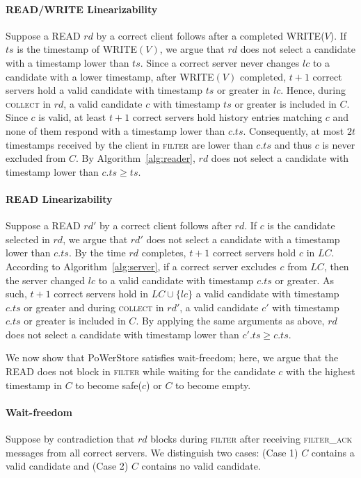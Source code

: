 \documentclass[10pt,conference,compsocconf]{IEEEtran}
\newcommand{\protocol}{PoWerStore}
\begin{document}
\paragraph{\textsc{READ}/\textsc{WRITE} Linearizability}
Suppose a \textsc{READ} $rd$ by a correct client follows after a completed \textsc{WRITE}($V$). If $ts$ is the timestamp of \textsc{WRITE}$(V)$, we argue that $rd$ does not select a candidate with a timestamp lower than $ts$. Since a correct server never changes $lc$ to a candidate with a lower timestamp, after \textsc{WRITE}$(V)$ completed, $t+1$ correct servers hold a valid candidate with timestamp $ts$ or greater in $lc$. Hence, during \textsc{collect} in $rd$, a valid candidate $c$ with timestamp $ts$ or greater is included in $C$. Since $c$ is valid, at least $t+1$ correct servers hold history entries matching $c$ and none of them respond with a timestamp lower than $c.ts$. Consequently, at most $2t$ timestamps received by the client in \textsc{filter} are lower than $c.ts$ and thus $c$ is never excluded from $C$. By Algorithm~\ref{alg:reader}, $rd$ does not select a candidate with timestamp lower than $c.ts \geq ts$.

\paragraph{\textsc{READ} Linearizability}
Suppose a \textsc{READ} $rd'$ by a correct client follows after $rd$. If $c$ is the candidate selected in $rd$, we argue that $rd'$ does not select a candidate with a timestamp lower than $c.ts$.
By the time $rd$ completes, $t+1$ correct servers hold $c$ in $LC$. According to Algorithm~\ref{alg:server}, if a correct server excludes $c$ from $LC$, then the server changed $lc$ to a valid candidate with timestamp $c.ts$ or greater. As such, $t+1$ correct servers hold in $LC \cup \{ lc \}$ a valid candidate with timestamp $c.ts$ or greater and during \textsc{collect} in $rd'$, a valid candidate $c'$ with timestamp $c.ts$ or greater is included in $C$. By applying the same arguments as above, $rd$ does not select a candidate with timestamp lower than $c'.ts \geq c.ts$.

We now show that \protocol{} satisfies wait-freedom; here, we argue that the \textsc{READ} does not block in \textsc{filter} while waiting for the candidate $c$ with the highest timestamp in $C$ to become \textsf{safe}($c$) or $C$ to become empty.

\paragraph{Wait-freedom}
Suppose by contradiction that $rd$ blocks during \textsc{filter} after receiving \textsc{filter\_ack} messages from all correct servers. We distinguish two cases: (Case 1) $C$ contains a valid candidate and (Case 2) $C$ contains no valid candidate.
\end{document}
